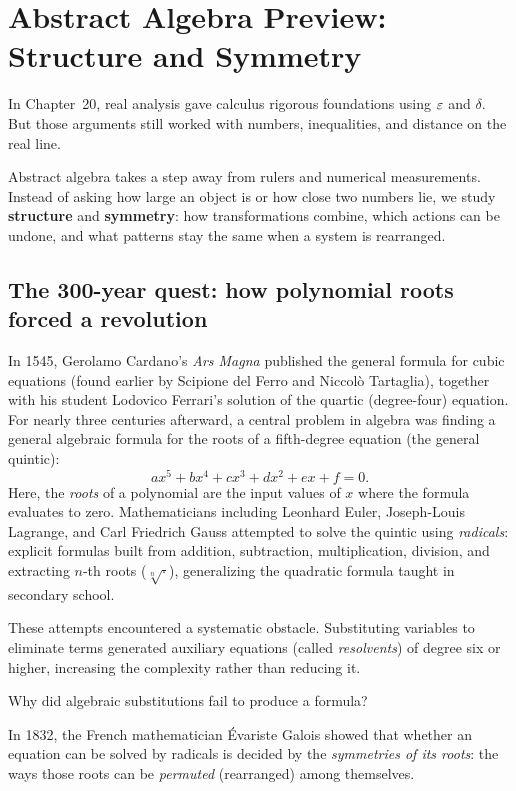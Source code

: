 \section{Abstract Algebra Preview: Structure and Symmetry}
\chapterline

In Chapter~20, real analysis gave calculus rigorous foundations using $\varepsilon$ and $\delta$. But those arguments still worked with numbers, inequalities, and distance on the real line.

Abstract algebra takes a step away from rulers and numerical measurements. Instead of asking how large an object is or how close two numbers lie, we study \textbf{structure} and \textbf{symmetry}: how transformations combine, which actions can be undone, and what patterns stay the same when a system is rearranged.

\subsection{The 300-year quest: how polynomial roots forced a revolution}

In 1545, Gerolamo Cardano's \emph{Ars Magna} published the general formula for cubic equations (found earlier by Scipione del Ferro and Niccol\`o Tartaglia), together with his student Lodovico Ferrari's solution of the quartic (degree-four) equation. For nearly three centuries afterward, a central problem in algebra was finding a general algebraic formula for the roots of a fifth-degree equation (the general quintic):
\[
a x^5 + b x^4 + c x^3 + d x^2 + e x + f = 0.
\]
Here, the \emph{roots} of a polynomial are the input values of $x$ where the formula evaluates to zero.
Mathematicians including Leonhard Euler, Joseph-Louis Lagrange, and Carl Friedrich Gauss attempted to solve the quintic using \emph{radicals}: explicit formulas built from addition, subtraction, multiplication, division, and extracting $n$-th roots ($\sqrt[n]{\cdot}$), generalizing the quadratic formula taught in secondary school.

These attempts encountered a systematic obstacle. Substituting variables to eliminate terms generated auxiliary equations (called \emph{resolvents}) of degree six or higher, increasing the complexity rather than reducing it.

Why did algebraic substitutions fail to produce a formula?

In 1832, the French mathematician \'{E}variste Galois showed that whether an equation can be solved by radicals is decided by the \emph{symmetries of its roots}: the ways those roots can be \emph{permuted} (rearranged) among themselves.

